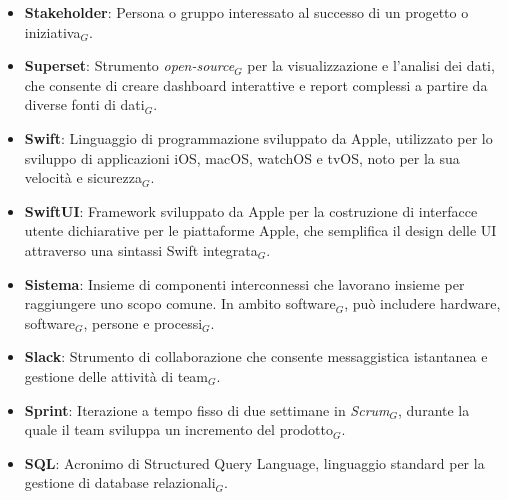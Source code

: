 \begin{itemize}
    \item \textbf{Stakeholder}: Persona o gruppo interessato al successo di un progetto o iniziativa$_G$.
    \item \textbf{Superset}: Strumento \textit{open-source}$_G$ per la visualizzazione e l'analisi dei dati, che consente di creare dashboard interattive e report complessi a partire da diverse fonti di dati$_G$.
    \item \textbf{Swift}: Linguaggio di programmazione sviluppato da Apple, utilizzato per lo sviluppo di applicazioni iOS, macOS, watchOS e tvOS, noto per la sua velocità e sicurezza$_G$.
    \item \textbf{SwiftUI}: Framework sviluppato da Apple per la costruzione di interfacce utente dichiarative per le piattaforme Apple, che semplifica il design delle UI attraverso una sintassi Swift integrata$_G$.
    \item \textbf{Sistema}: Insieme di componenti interconnessi che lavorano insieme per raggiungere uno scopo comune. In ambito software$_G$, può includere hardware, software$_G$, persone e processi$_G$.
    \item \textbf{Slack}: Strumento di collaborazione che consente messaggistica istantanea e gestione delle attività di team$_G$.
    \item \textbf{Sprint}: Iterazione a tempo fisso di due settimane in \textit{Scrum}$_G$, durante la quale il team sviluppa un incremento del prodotto$_G$.
    \item \textbf{SQL}: Acronimo di Structured Query Language, linguaggio standard per la gestione di database relazionali$_G$.
\end{itemize}
